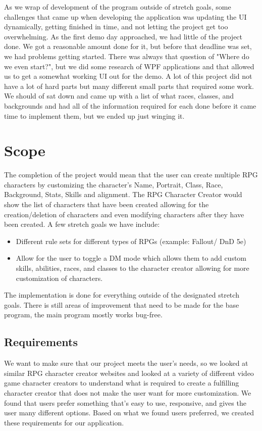 \documentclass[10pt,conference,onecolumn,compsoc]{IEEEtran}
\begin{document}
As we wrap of development of the program outside of stretch goals, some challenges that came up when developing the application was updating the UI dynamically, getting finished in time, and not letting the project get too overwhelming. As the first demo day approached, we had little of the project done. We got a reasonable amount done for it, but before that deadline was set, we had problems getting started. There was always that question of "Where do we even start?", but we did some research of WPF applications and that allowed us to get a somewhat working UI out for the demo. A lot of this project did not have a lot of hard parts but many different small parts that required some work. We should of sat down and came up with a list of what races, classes, and backgrounds and had all of the information required for each done before it came time to implement them, but we ended up just winging it.


\section{Scope}
The completion of the project would mean that the user can create multiple RPG characters by customizing the character's Name, Portrait, Class, Race, Background, Stats, Skills and alignment.
The RPG Character Creator would show the list of characters that have been created allowing for the creation/deletion of characters and even modifying characters after they have been created.
A few stretch goals we have include:
\begin{itemize} 
\item Different rule sets for different types of RPGs (example: Fallout/ DnD 5e)
\item Allow for the user to toggle a DM mode which allows them to add custom skills, abilities, races, and  classes to the character creator allowing for more customization of characters.
\end{itemize}
The implementation is done for everything outside of the designated stretch goals. There is still areas of improvement that need to be made for the base program, the main program mostly works bug-free.

\subsection{Requirements}
We want to make sure that our project meets the user's needs, so we looked at similar RPG character creator websites and looked at a variety of different video game character creators to understand what is required to create a fulfilling character creator that does not make the user want for more customization. We found that users prefer something that's easy to use, responsive, and gives the user many different options. Based on what we found users preferred, we created these requirements for our application.
\end{document}
